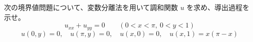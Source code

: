 
次の境界値問題について、変数分離法を用いて調和関数 $u$ を求め、導出過程を示せ。
\[
u_{xx} + u_{yy} = 0 \qquad (0 < x < \pi,\ 0 < y < 1)
\]
\[
u(0, y) = 0, \quad u(\pi, y) = 0, \quad u(x, 0) = 0, \quad u(x, 1) = x(\pi - x)
\]

